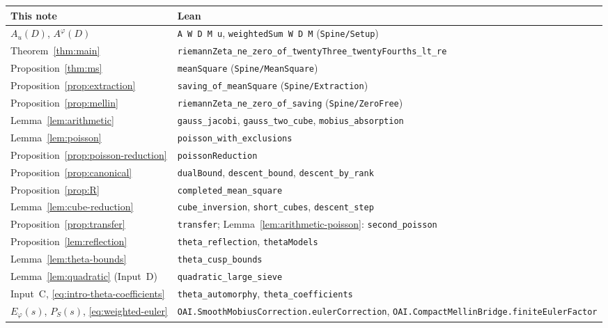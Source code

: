 \medskip
{\small\raggedright
\begin{tabular}{@{}p{}p{}@{}}
\toprule
This note & Lean\\
\midrule
$A_u(D)$, $A^\varphi(D)$ & \texttt{A W D M u}, \texttt{weightedSum W D M} (\texttt{Spine/Setup})\\
Theorem~\ref{thm:main} & \texttt{riemannZeta\_ne\_zero\_of\_twentyThree\_twentyFourths\_lt\_re}\\
Proposition~\ref{thm:ms} & \texttt{meanSquare} (\texttt{Spine/MeanSquare})\\
Proposition~\ref{prop:extraction} & \texttt{saving\_of\_meanSquare} (\texttt{Spine/Extraction})\\
Proposition~\ref{prop:mellin} & \texttt{riemannZeta\_ne\_zero\_of\_saving} (\texttt{Spine/ZeroFree})\\
Lemma~\ref{lem:arithmetic} & \texttt{gauss\_jacobi}, \texttt{gauss\_two\_cube}, \texttt{mobius\_absorption}\\
Lemma~\ref{lem:poisson} & \texttt{poisson\_with\_exclusions}\\
Proposition~\ref{prop:poisson-reduction} & \texttt{poissonReduction}\\
Proposition~\ref{prop:canonical} & \texttt{dualBound}, \texttt{descent\_bound}, \texttt{descent\_by\_rank}\\
Proposition~\ref{prop:R} & \texttt{completed\_mean\_square}\\
Lemma~\ref{lem:cube-reduction} & \texttt{cube\_inversion}, \texttt{short\_cubes}, \texttt{descent\_step}\\
Proposition~\ref{prop:transfer} & \texttt{transfer}; Lemma~\ref{lem:arithmetic-poisson}: \texttt{second\_poisson}\\
Proposition~\ref{lem:reflection} & \texttt{theta\_reflection}, \texttt{thetaModels}\\
Lemma~\ref{lem:theta-bounds} & \texttt{theta\_cusp\_bounds}\\
Lemma~\ref{lem:quadratic} (Input~D) & \texttt{quadratic\_large\_sieve}\\
Input~C, \eqref{eq:intro-theta-coefficients} & \texttt{theta\_automorphy}, \texttt{theta\_coefficients}\\
$E_\varphi(s)$, $P_S(s)$, \eqref{eq:weighted-euler} & \texttt{OAI.SmoothMobiusCorrection.\allowbreak eulerCorrection}, \texttt{OAI.CompactMellinBridge.\allowbreak finiteEulerFactor}\\
\bottomrule
\end{tabular}\par}

